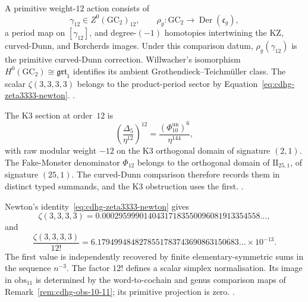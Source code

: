 \begin{remark}
\label{rem:cdhg-depth-4-grt1}
A primitive weight-$12$ action consists of
\[
 \gamma_{12}\in Z^0(\mathrm{GC}_2)_{12},
 \qquad
 \rho_g\colon\mathrm{GC}_2
 \longrightarrow\operatorname{Der}(\mathfrak c_g),
\]
a period map on \([\gamma_{12}]\), and degree-\((-1)\) homotopies
intertwining the KZ, curved-Dunn, and Borcherds images.  Under this
comparison datum, \(\rho_g(\gamma_{12})\) is the primitive
curved-Dunn correction.  Willwacher's isomorphism
\(H^0(\mathrm{GC}_2)\cong\mathfrak{grt}_1\) identifies its ambient
Grothendieck--Teichm\"uller class.  The scalar
\(\zeta(3,3,3,3)\) belongs to the product-period sector by
Equation~\eqref{eq:cdhg-zeta3333-newton}.
\cite{Willwacher2015,Brown2012,Drinfeld1990}.
\end{remark}

\begin{remark}
\label{rem:cdhg-fake-monster-non-interference}
The K3 section at order~$12$ is
\[
 \left(\frac{\Delta_5}{\eta^{12}}\right)^{12}
 =
 \frac{(\Phi_{10}^{\mathrm{un}})^6}{\eta^{144}},
\]
with raw modular weight \(-12\) on the K3 orthogonal domain of
signature \((2,1)\).  The Fake-Monster denominator \(\Phi_{12}\)
belongs to the orthogonal domain of
\(\mathrm{II}_{25,1}\), of signature \((25,1)\).  The curved-Dunn
comparison therefore records them in distinct typed summands, and
the K3 obstruction uses the first.
\cite{Borcherds1998,GritsenkoNikulin1998}.
\end{remark}

\begin{remark}
\label{rem:cdhg-c12-explicit}
Newton's identity~\eqref{eq:cdhg-zeta3333-newton} gives
\[
 \zeta(3,3,3,3)
 =
 0.00029599901404317183550096081913354558\ldots,
\]
and
\[
 \frac{\zeta(3,3,3,3)}{12!}
 =
 6.1794994848278551783743690863150683\ldots\times10^{-13}.
\]
The first value is independently recovered by finite
elementary-symmetric sums in the sequence \(n^{-3}\).  The factor
\(12!\) defines a scalar simplex normalisation.  Its image in
\(\mathrm{obs}_{11}\) is determined by the word-to-cochain and genus
comparison maps of Remark~\ref{rem:cdhg-obs-10-11}; its primitive
projection is zero.
\cite{Brown2011,Hoffman1997}.
\end{remark}
